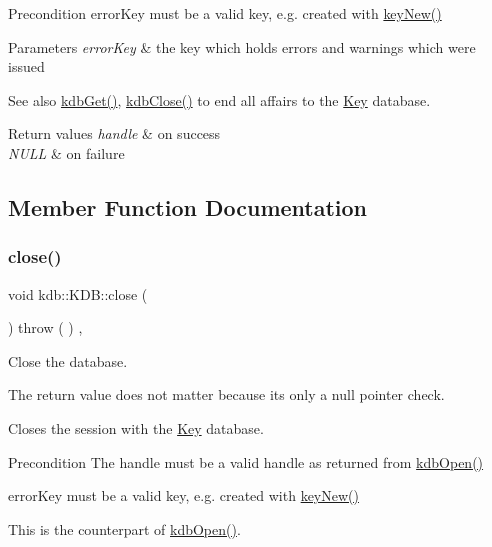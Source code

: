 \begin{DoxyPrecond}{Precondition}
error\+Key must be a valid key, e.\+g. created with \mbox{\hyperlink{group__key_gad23c65b44bf48d773759e1f9a4d43b89}{key\+New()}}
\end{DoxyPrecond}

\begin{DoxyParams}{Parameters}
{\em error\+Key} & the key which holds errors and warnings which were issued \\
\hline
\end{DoxyParams}
\begin{DoxySeeAlso}{See also}
\mbox{\hyperlink{group__kdb_ga28e385fd9cb7ccfe0b2f1ed2f62453a1}{kdb\+Get()}}, \mbox{\hyperlink{group__kdb_gadb54dc9fda17ee07deb9444df745c96f}{kdb\+Close()}} to end all affairs to the \mbox{\hyperlink{group__key}{Key}} database. 
\end{DoxySeeAlso}

\begin{DoxyRetVals}{Return values}
{\em handle} & on success \\
\hline
{\em N\+U\+LL} & on failure \\
\hline
\end{DoxyRetVals}


\subsection{Member Function Documentation}
\mbox{\label{classkdb_1_1KDB_a1b3ff4a68c2c935d67dce843bc4ad01b}} 
\subsubsection{\texorpdfstring{close()}{close()}\hspace{0.1cm}{\footnotesize\ttfamily [1/2]}}
{\footnotesize\ttfamily void kdb\+::\+K\+D\+B\+::close (\begin{DoxyParamCaption}{ }\end{DoxyParamCaption}) throw ( ) \hspace{0.3cm}{\ttfamily [inline]}, {\ttfamily [virtual]}}



Close the database. 

The return value does not matter because its only a null pointer check.

Closes the session with the \mbox{\hyperlink{classkdb_1_1Key}{Key}} database. \begin{DoxyPrecond}{Precondition}
The handle must be a valid handle as returned from \mbox{\hyperlink{group__kdb_ga6808defe5870f328dd17910aacbdc6ca}{kdb\+Open()}}

error\+Key must be a valid key, e.\+g. created with \mbox{\hyperlink{group__key_gad23c65b44bf48d773759e1f9a4d43b89}{key\+New()}}
\end{DoxyPrecond}
This is the counterpart of \mbox{\hyperlink{group__kdb_ga6808defe5870f328dd17910aacbdc6ca}{kdb\+Open()}}.

